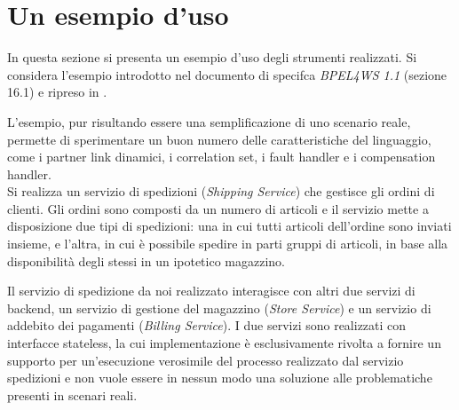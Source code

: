 
\section{Un esempio d'uso}

In questa sezione si presenta un esempio d'uso degli strumenti
realizzati. Si considera l'esempio introdotto nel documento di specifca
\emph{BPEL4WS 1.1} \cite{BPEL11Spec} (sezione 16.1) e ripreso in
\cite{LaPuTie1}.

L'esempio, pur risultando essere una semplificazione di uno scenario reale,
permette di sperimentare un buon numero delle caratteristiche del linguaggio,	
come i partner link dinamici, i correlation set, i fault handler e i
compensation handler.
\\

Si realizza un servizio di spedizioni (\emph{Shipping Service}) che gestisce
gli ordini di clienti. Gli ordini sono composti da un numero di
articoli e il servizio mette a disposizione due tipi di spedizioni: una in cui
tutti articoli dell'ordine sono inviati insieme, e l'altra, in cui è possibile
spedire in parti gruppi di articoli, in base alla disponibilità degli stessi in
un ipotetico magazzino.

Il servizio di spedizione da noi realizzato interagisce con altri due servizi
di backend, un servizio di gestione del magazzino (\emph{Store Service}) e un
servizio di addebito dei pagamenti (\emph{Billing Service}). I due servizi
sono realizzati con interfacce stateless, la cui implementazione è
esclusivamente rivolta a fornire un supporto per un'esecuzione verosimile del
processo realizzato dal servizio spedizioni e non vuole essere in nessun modo
una soluzione alle problematiche presenti in scenari reali.

